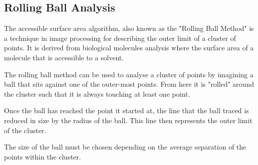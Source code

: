 
\subsection{Rolling Ball Analysis}
\label{sub:rolling_ball_analysis}

The accessible surface area algorithm, also known as the "Rolling Ball Method"
is a technique in image processing for describing the outer limit of a cluster
of points. It is derived from biological molecules analysis where the surface
area of a molecule that is accessible to a solvent.

The rolling ball method can be used to analyse a cluster of points by imagining
a ball that sits against one of the outer-most points. From here it is "rolled"
around the cluster such that it is always touching at least one point.

Once the ball has reached the point it started at, the line that the ball
traced is reduced in size by the radius of the ball. This line then represents
the outer limit of the cluster.

The size of the ball must be chosen depending on the average separation of the
points within the cluster.
